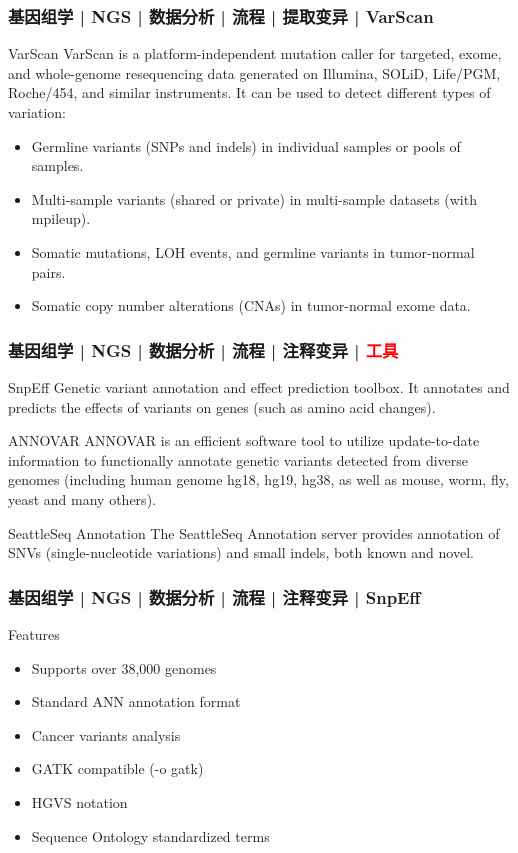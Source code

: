 \begin{frame}
  \frametitle{基因组学 | NGS | 数据分析 | 流程 | 提取变异 | VarScan}
  \begin{block}{VarScan}
    VarScan is a platform-independent mutation caller for targeted, exome, and whole-genome resequencing data generated on Illumina, SOLiD, Life/PGM, Roche/454, and similar instruments. It can be used to detect different types of variation:
    \begin{itemize}
      \item Germline variants (SNPs and indels) in individual samples or pools of samples.
      \item Multi-sample variants (shared or private) in multi-sample datasets (with mpileup).
      \item Somatic mutations, LOH events, and germline variants in tumor-normal pairs.
      \item Somatic copy number alterations (CNAs) in tumor-normal exome data.
    \end{itemize}
  \end{block}
\end{frame}

\begin{frame}
  \frametitle{基因组学 | NGS | 数据分析 | 流程 | 注释变异 | \textcolor{red}{工具}}
  \begin{block}{SnpEff}
    Genetic variant annotation and effect prediction toolbox. It annotates and predicts the effects of variants on genes (such as amino acid changes).
  \end{block}
  \pause
  \begin{block}{ANNOVAR}
    ANNOVAR is an efficient software tool to utilize update-to-date information to functionally annotate genetic variants detected from diverse genomes (including human genome hg18, hg19, hg38, as well as mouse, worm, fly, yeast and many others).
  \end{block}
  \pause
  \begin{block}{SeattleSeq Annotation}
    The SeattleSeq Annotation server provides annotation of SNVs (single-nucleotide variations) and small indels, both known and novel.
  \end{block}
\end{frame}

\begin{frame}
  \frametitle{基因组学 | NGS | 数据分析 | 流程 | 注释变异 | SnpEff}
  \begin{block}{Features}
    \begin{itemize}
      \item Supports over 38,000 genomes
      \item Standard ANN annotation format
      \item Cancer variants analysis
      \item GATK compatible (-o gatk)
      \item HGVS notation
      \item Sequence Ontology standardized terms
    \end{itemize}
  \end{block}
\end{frame}

